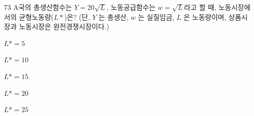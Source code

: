 \begin{question}{73}
A국의 총생산함수는 $Y=20 \sqrt { L }$, 노동공급함수는 $w= \sqrt { L }$라고 할 때, 노동시장에서의 균형노동량($L*$)은? (단, $Y$ 는 총생산, $w$ 는 실질임금, $L$ 은 노동량이며, 상품시장과 노동시장은 완전경쟁시장이다.)
\begin{choices}
  \item $L*=5$
  \item $L*=10$
  \item $L*=15$
  \item $L*=20$
  \item $L*=25$
\end{choices}
\end{question}

